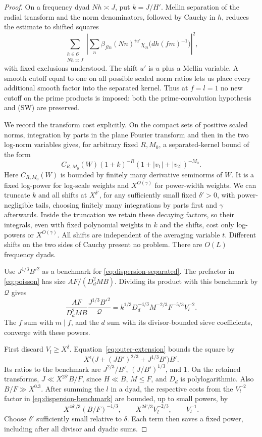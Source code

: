 \begin{proof}
On a frequency dyad $Nh\asymp J$, put $k=J/H'$. Mellin separation of
the radial transform and the norm denominators, followed by Cauchy in
$h$, reduces the estimate to shifted squares
\begin{equation}
 \sum_{\substack{h\in\mathcal O\\Nh\asymp J}}
 \left|\sum_n\beta_{fln}(Nn)^{iu'}
             \chi_n\bigl(dh(fm)^{-1}\bigr)\right|^2,
 \label{eq:dispersion-separated}
\end{equation}
with fixed exclusions understood. The shift $u'$ is $u$ plus a Mellin
variable. A smooth cutoff equal to one on all possible scaled norm
ratios lets us place every additional smooth factor into the separated
kernel. Thus at $f=l=1$ no new cutoff on the prime products is imposed:
both the prime-convolution hypothesis and (SW) are preserved.

We record the transform cost explicitly. On the compact sets of positive
scaled norms, integration by parts in the plane Fourier transform and
then in the two log-norm variables gives, for arbitrary fixed $R,M_0$,
a separated-kernel bound of the form
\[
 C_{R,M_0}(W)(1+k)^{-R}
 (1+|v_1|+|v_2|)^{-M_0}.
\]
Here $C_{R,M_0}(W)$ is bounded by finitely many derivative seminorms of
$W$. It is a fixed log-power for log-scale weights and $X^{O(\gamma)}$
for power-width weights. We can truncate $k$ and all shifts at
$X^{\delta'}$, for any sufficiently small fixed $\delta'>0$, with
power-negligible tails, choosing finitely many integrations by parts
first and $\gamma$ afterwards. Inside the truncation we retain these
decaying factors, so their integrals, even with fixed polynomial
weights in $k$ and the shifts, cost only log-powers or $X^{O(\gamma)}$.
All shifts are independent of the averaging variable $t$. Different
shifts on the two sides of Cauchy present no problem. There are $O(L)$
frequency dyads.

Use $J^{1/3}B'^2$ as a benchmark for
\eqref{eq:dispersion-separated}. The prefactor in
\eqref{eq:poisson} has size $AF/(D_d^2MB)$. Dividing its product with
this benchmark by $\mathcal Q$ gives
\begin{equation}
 \frac{AF}{D_d^2MB}\frac{J^{1/3}B'^2}{\mathcal Q}
 =k^{1/3}D_d^{-4/3}M^{-2/3}F^{-5/3}V_l^{-2}.
 \label{eq:dispersion-benchmark}
\end{equation}
The $f$ sum with $m\mid f$, and the $d$ sum with its divisor-bounded
sieve coefficients, converge with these powers.

First discard $V_l\ge X^\delta$.
Equation~\eqref{eq:outer-extension} bounds the square by
\[
 X^\epsilon\bigl(J+(JB')^{2/3}+J^{1/3}B'\bigr)B'.
\]
Its ratios to the benchmark are $J^{2/3}/B'$, $(J/B')^{1/3}$, and $1$.
On the retained transforms,
$J\ll X^{2\delta'}B/F$, since $H\ll B$, $M\le F$, and $D_d$ is
polylogarithmic. Also $B/F\gg X^{0.3}$. After summing the $l$ in a
dyad, the respective costs from the $V_l^{-2}$ factor in
\eqref{eq:dispersion-benchmark} are bounded, up to small powers, by
\[
 X^{4\delta'/3}(B/F)^{-1/3},\qquad
 X^{2\delta'/3}V_l^{-2/3},\qquad V_l^{-1}.
\]
Choose $\delta'$ sufficiently small relative to $\delta$. Each term
then saves a fixed power, including after all divisor and dyadic sums.


\end{proof}
